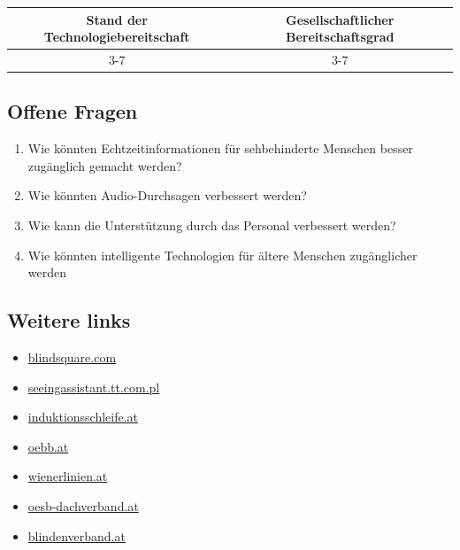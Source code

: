 \documentclass[
]{book}
\providecommand{\tightlist}{%
  \setlength{\itemsep}{0pt}\setlength{\parskip}{0pt}}
\begin{document}
\begin{longtable}[]{@{}cc@{}}
\toprule
Stand der Technologiebereitschaft & Gesellschaftlicher Bereitschaftsgrad\tabularnewline
\midrule
\endhead
3-7 & 3-7\tabularnewline
\bottomrule
\end{longtable}

\hypertarget{offene-fragen-25}{%
\subsection*{Offene Fragen}\label{offene-fragen-25}}

\begin{enumerate}
\def\labelenumi{\arabic{enumi}.}
\tightlist
\item
  Wie könnten Echtzeitinformationen für sehbehinderte Menschen besser zugänglich gemacht werden?
\item
  Wie könnten Audio-Durchsagen verbessert werden?
\item
  Wie kann die Unterstützung durch das Personal verbessert werden?
\item
  Wie könnten intelligente Technologien für ältere Menschen zugänglicher werden
\end{enumerate}

\hypertarget{weitere-links-23}{%
\subsection*{Weitere links}\label{weitere-links-23}}

\begin{itemize}
\tightlist
\item
  \href{https://www.blindsquare.com/de/about/}{blindsquare.com}
\item
  \href{http://seeingassistant.tt.com.pl/move/}{seeingassistant.tt.com.pl}
\item
  \href{https://www.induktionsschleife.at/anwendungen/}{induktionsschleife.at}
\item
  \href{https://www.oebb.at/de/reiseplanung-services/barrierefrei-reisen}{oebb.at}
\item
  \href{https://www.wienerlinien.at/eportal3/ep/contentView.do?pageTypeId=66526\&channelId=-47186\&programId=74577\&contentId=5002349\&contentTypeId=1001}{wienerlinien.at}
\item
  \href{https://www.oesb-dachverband.at/}{oesb-dachverband.at}
\item
  \href{https://www.blindenverband.at/}{blindenverband.at}
\end{itemize}
\end{document}
